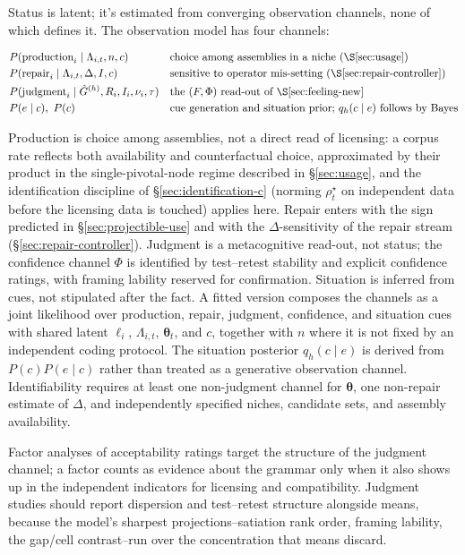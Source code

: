 Status is latent; it's estimated from converging observation channels, none of
which defines it. The observation model has four channels:

\begin{align}
&P(\text{production}_i\mid\Lambda_{i,t},n,c)
  && \text{choice among assemblies in a niche (\S\ref{sec:usage})} \\
&P(\text{repair}_i\mid\Lambda_{i,t},\Delta,I,c)
  && \text{sensitive to operator mis-setting (\S\ref{sec:repair-controller})} \\
&P(\text{judgment}_i\mid \hat{G}^{(h)},R_i,I_i,\nu_i,\tau)
  && \text{the }(F,\Phi)\text{ read-out of \S\ref{sec:feeling-new}} \\
&P(e\mid c),\ P(c)
  && \text{cue generation and situation prior; }q_h(c\mid e)\text{ follows by Bayes}
\end{align}

Production is choice among assemblies, not a direct read of licensing: a corpus
rate reflects both availability and counterfactual choice, approximated by their
product in the single-pivotal-node regime described in \S\ref{sec:usage}, and the identification discipline of
\S\ref{sec:identification-c} (norming $\rho_t^\star$ on independent data before
the licensing data is touched) applies here. Repair enters with the sign
predicted in \S\ref{sec:projectible-use} and with the $\Delta$-sensitivity of the
repair stream (\S\ref{sec:repair-controller}). Judgment is a metacognitive
read-out, not status; the confidence channel $\Phi$ is identified by
test--retest stability and explicit confidence ratings, with framing lability
reserved for confirmation. Situation is inferred from cues, not stipulated after
the fact. A fitted version composes the channels as a joint likelihood over
production, repair, judgment, confidence, and situation cues with shared latent
$\ell_i$, $\Lambda_{i,t}$, $\boldsymbol{\theta}_t$, and $c$, together with $n$
where it is not fixed by an independent coding protocol. The situation posterior
$q_h(c\mid e)$ is derived from $P(c)P(e\mid c)$ rather than treated as a
generative observation channel. Identifiability requires at least one
non-judgment channel for $\boldsymbol{\theta}$, one non-repair estimate of
$\Delta$, and independently specified niches, candidate sets, and assembly
availability.

Factor analyses of acceptability ratings target the structure of the judgment
channel; a factor counts as evidence about the grammar only when it also shows up
in the independent indicators for licensing and compatibility. Judgment studies
should report dispersion and test--retest structure alongside means, because the
model's sharpest projections--satiation rank order, framing lability, the
gap/cell contrast--run over the concentration that means discard.

